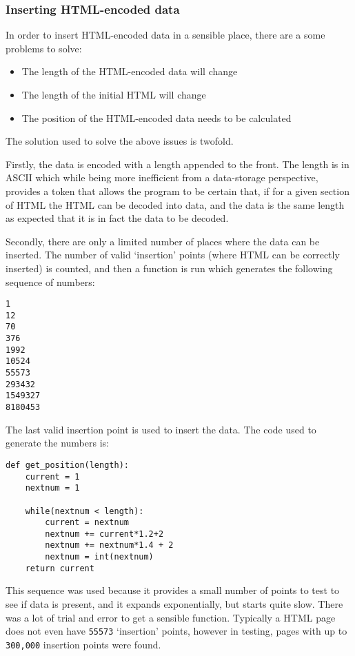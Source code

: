 \subsubsection{Inserting HTML-encoded data}
In order to insert HTML-encoded data in a sensible place, there are a some problems to solve:
\begin{itemize}
    \item The length of the HTML-encoded data will change
    \item The length of the initial HTML will change
    \item The position of the HTML-encoded data needs to be calculated
\end{itemize}

The solution used to solve the above issues is twofold.\par
Firstly, the data is encoded with a length appended to the front.
The length is in ASCII which while being more inefficient from a data-storage perspective, provides a token that allows the program to be certain that, if for a given section of HTML the HTML can be decoded into data, and the data is the same length as expected that it is in fact the data to be decoded.\par
Secondly, there are only a limited number of places where the data can be inserted. The number of valid `insertion' points (where HTML can be correctly inserted) is counted, and then a function is run which generates the following sequence of numbers:
\begin{lstlisting}
1
12
70
376
1992
10524
55573
293432
1549327
8180453
\end{lstlisting}
The last valid insertion point is used to insert the data.
The code used to generate the numbers is:
\begin{lstlisting}
def get_position(length):
    current = 1
    nextnum = 1

    while(nextnum < length):
        current = nextnum
        nextnum += current*1.2+2
        nextnum += nextnum*1.4 + 2
        nextnum = int(nextnum)
    return current
\end{lstlisting}
This sequence was used because it provides a small number of points to test to see if data is present, and it expands exponentially, but starts quite slow. There was a lot of trial and error to get a sensible function.
Typically a HTML page does not even have \texttt{55573} `insertion' points, however in testing, pages with up to \texttt{300,000} insertion points were found.\par

